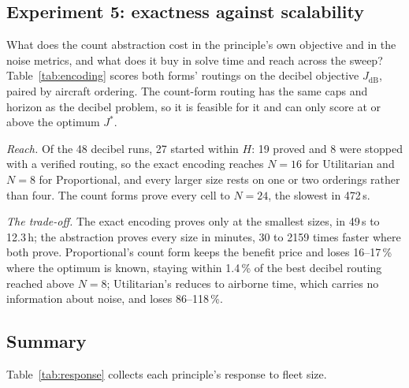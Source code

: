 \subsection{Experiment 5: exactness against scalability}
\label{sec:exp5}

What does the count abstraction cost in the principle's own objective and in the noise
metrics, and what does it buy in solve time and reach across the sweep?
Table~\ref{tab:encoding} scores both forms' routings on the decibel objective
$J_{\mathrm{dB}}$, paired by aircraft ordering. The count-form routing has the same caps
and horizon as the decibel problem, so it is feasible for it and can only score at or
above the optimum $J^*$.

\emph{Reach.} Of the 48 decibel runs, 27 started within $H$: 19 proved and 8 were stopped
with a verified routing, so the exact encoding reaches $N=16$ for Utilitarian and $N=8$
for Proportional, and every larger size rests on one or two orderings rather than four.
The count forms prove every cell to $N=24$, the slowest in 472\,s.

\emph{The trade-off.} The exact encoding proves only at the smallest sizes, in 49\,s
to 12.3\,h; the abstraction proves every size in minutes, 30 to 2159 times faster
where both prove. Proportional's count form keeps the benefit price and loses
16--17\,\% where the optimum is known, staying within 1.4\,\% of the best decibel routing
reached above $N=8$; Utilitarian's reduces to airborne time, which carries no information
about noise, and loses 86--118\,\%.




\subsection{Summary}
\label{sec:summary}

Table~\ref{tab:response} collects each principle's response to fleet size.

